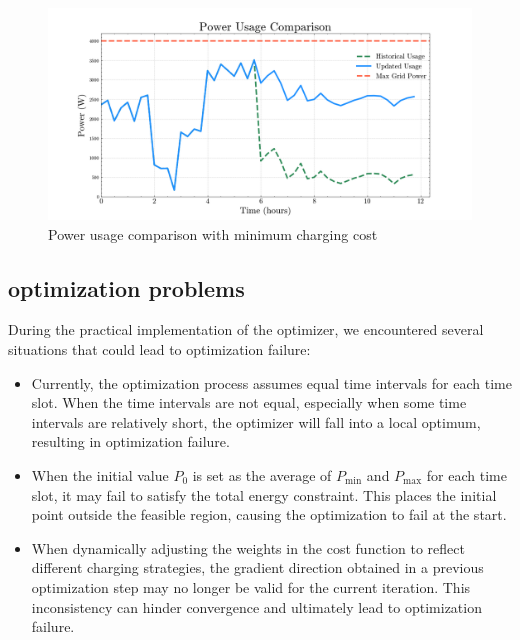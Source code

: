 \documentclass[
	english,
	ruledheaders=section,%
	class=report,%
	thesis={type=Report},%
	accentcolor=9c,%
	custommargins=true,%
	marginpar=false,%
	parskip=half-,%
	fontsize=11pt,%
	logofile={img/tuda_logo.pdf}, %
]{tudapub}
\begin{document}
\begin{figure}
    \centering
    \includegraphics[width=1\linewidth]{img/mod_2.png}
    \caption{Power usage comparison with minimum charging cost}
    \label{fig: mod2}
\end{figure}

\subsection{optimization problems}




During the practical implementation of the optimizer, we encountered several situations that could lead to optimization failure:

\begin{itemize}
 

\item Currently, the optimization process assumes equal time intervals for each time slot. When the time intervals are not equal, especially when some time intervals are relatively short, the optimizer will fall into a local optimum, resulting in optimization failure.

\item When the initial value $P_0$ is set as the average of $P_{\min}$ and $P_{\max}$ for each time slot, it may fail to satisfy the total energy constraint. This places the initial point outside the feasible region, causing the optimization to fail at the start.

\item When dynamically adjusting the weights in the cost function to reflect different charging strategies, the gradient direction obtained in a previous optimization step may no longer be valid for the current iteration. This inconsistency can hinder convergence and ultimately lead to optimization failure.

\end{itemize}
\end{document}
